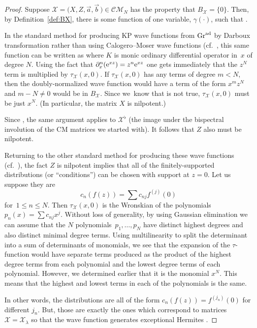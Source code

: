 \documentclass[10pt,a4paper]{amsart}
\numberwithin{equation}{section}
\theoremstyle{definition}
\def\X{\mathcal{X}}
\def\CM{\mathcal{C\!M}}
\begin{document}
 \begin{proof}
Suppose $\X=\bigl(X,Z,\vec a,\vec b\,\bigr)\in\CM_N$ has the property that
$B_{\X}=\{0\}$.
Then, by Definition~\ref{def:BX},
there is some function of one variable, $\gamma(\cdot)$, such that
\smash{$
\hat{\hat\psi}_{\X}(x,0,z)=\gamma(xz)$}.

In the standard method for producing KP wave functions from ${\rm Gr}^{\rm ad}$ by Darboux
transformation rather than using Calogero--Moser wave functions
(cf.~\cite{cmbis,WilsonBisp}, this same function can be written as
\smash{$
\hat{\hat\psi}_{\X}(x,0,z)=\tau_{\X}(x,0) K({\rm e}^{xz})
$}
where $K$ is monic ordinary differential operator in~$x$ of degree
$N$. Using the fact that $\partial_x^n({\rm e}^{xz})=z^n{\rm e}^{xz}$ one gets
immediately that the $z^N$ term is multiplied by $\tau_{\X}(x,0)$.
If $\tau_{\X}(x,0)$ has any terms of degree $m<N$, then the
doubly-normalized wave function would have a term of the form $x^mz^N$
and $m-N\not=0$ would be in $B_{\X}$. Since we~know that is not true,
$\tau_{\X}(x,0)$ must be just $x^N$. (In particular, the matrix $X$
is nilpotent.)

Since \smash{$\hat{\hat\psi}_{\X}^{\flat}(x,0,z)=\hat{\hat\psi}_{\X}(z,0,x)$},
 the same argument applies to $\X^{\flat}$ (the image under the
 bispectral involution of the CM matrices we started with). It
 follows that $Z$ also must be nilpotent.

Returning to the other standard method for producing these wave
functions (cf.~\cite{cmbis,WilsonBisp}), the fact $Z$ is nilpotent
implies that all of the finitely-supported distributions (or ``conditions'') can be chosen with support at
$z=0$. Let us suppose they are
\[
c_n(f(z))=\sum c_{nj} f^{(j)}(0)\] for~${1\leq n\leq N}$.
Then $\tau_{\X}(x,0)$ is the Wronskian of the polynomials $p_n(x)=\sum c_{nj}x^j$.
Without loss of generality, by using Gaussian elimination we
can assume that the $N$ polynomials~${p_1,\ldots,p_N}$ have distinct
highest degrees and also distinct minimal degree terms. Using
multilinearity to split the determinant into a sum of determinants of
monomials, we see that the expansion of the $\tau$-function would have
separate terms produced as the product of the highest degree terms
from each polynomial and the lowest degree terms of each polynomial.
However, we determined earlier that it is the monomial $x^N$. This
means that the highest and lowest terms in each of the polynomials is
the same.

In other words, the distributions are all of the form
$c_n(f(z))=f^{(j_n)}(0)$ for different $j_n$. But, those are exactly
the ones which correspond to matrices $\X=\X_{\lambda}$ so that the
wave function generates exceptional Hermites \cite{PThesis,PalusoKasman,WilsonCM}.
 \end{proof}
\end{document}
